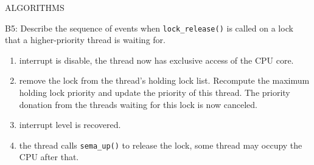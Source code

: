\begin{aspect}{ALGORITHMS}
	\begin{qc}
		B5: Describe the sequence of events when \lstinline{lock_release()} is called on a lock that a higher-priority thread is waiting for.
	\end{qc}

	\begin{enumerate}
		\item interrupt is disable, the thread now has exclusive access of the CPU core.
		\item remove the lock from the thread's holding lock list.
		      Recompute the maximum holding lock priority and update the priority of this thread.
		      The priority donation from the threads waiting for this lock is now canceled.
		\item interrupt level is recovered.
		\item the thread calls \lstinline{sema_up()} to release the lock, some thread may occupy the CPU after that.
	\end{enumerate}

\end{aspect}

